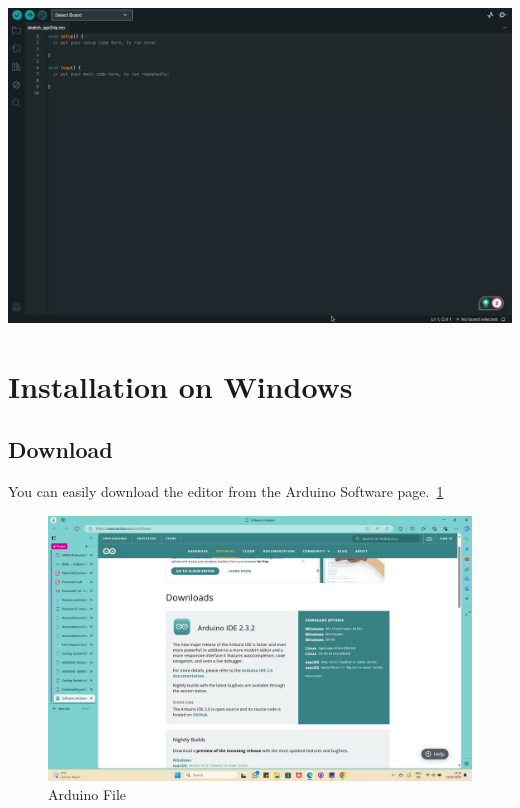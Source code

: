 \begin{center}
	\label{fig:Arduino Sketch}
	\includegraphics[width=0.7\linewidth]{images/ArduinoIDE/ArduinoIDESketch.png}
\end{center}

	
\section{Installation on Windows}
	
	\subsection{Download}
		You can easily download the editor from the Arduino Software page.~\ref{Download} \cite{arduino_ide_windows_tutorial:2025}
		
		\begin{figure}
			\begin{center}
				\includegraphics[width=0.7\linewidth]{Images/Arduino/DownloadArduinofile.png}
				\caption{Arduino File}
				\label{Download}
			\end{center}
		\end{figure}
	

